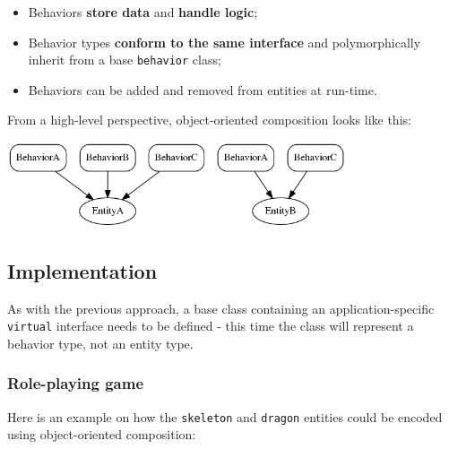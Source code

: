 \documentclass[oneside, 12pt, a4paper, openany]{book}
\let\origfigure=\figure
\let\endorigfigure=\endfigure
\renewenvironment{figure}[1][]{%
\origfigure[H]
}{%
\endorigfigure
}
\begin{document}
\begin{itemize}
\item
  Behaviors \textbf{store data} and \textbf{handle logic};
\item
  Behavior types \textbf{conform to the same interface} and
  polymorphically inherit from a base
  \texttt{behavior}
  class;
\item
  Behaviors can be added and removed from entities at run-time.
\end{itemize}

From a high-level perspective, object-oriented composition looks like
this:

\begin{figure}[htbp]
\centering
\includegraphics[width=0.75000\textwidth]{source/figures/generated/ecs/overview/oop_composition/example.png}
\caption{Object-oriented composition: hypotetical entity hierarchy}
\end{figure}

\subsection{Implementation}\label{implementation-1}

As with the previous approach, a base class containing an
application-specific
\texttt{virtual}
interface needs to be defined - this time the class will represent a
behavior type, not an entity type.

\subsubsection{Role-playing game}\label{role-playing-game-2}

Here is an example on how the
\texttt{skeleton}
and
\texttt{dragon}
entities could be encoded using object-oriented composition:
\end{document}
